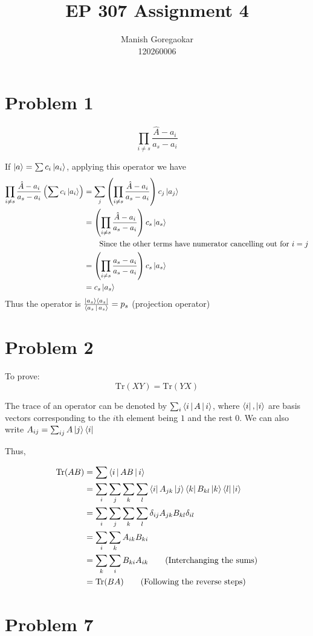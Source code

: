 \documentclass[12pt]{article}
\title{EP 307 Assignment 4}
\author{Manish Goregaokar\\120260006}
\begin{document}
\maketitle

\section*{Problem 1}
$$\prod_{i\neq s}\frac{\hat A-a_i}{a_s-a_i}$$

If $\Ket{a}=\sum c_i\Ket{a_i}$, applying this operator we have \begin{align*}
\prod_{i\neq s}\frac{\hat A-a_i}{a_s-a_i}\left(\sum c_i\Ket{a_i}\right)&=\sum_j\left(\prod_{i\neq s}\frac{\hat A-a_i}{a_s-a_i}\right)c_j\Ket{a_j}\\
&=\left(\prod_{i\neq s}\frac{\hat A-a_i}{a_s-a_i}\right)c_s\Ket{a_s}\\&\qquad\text{Since the other terms have numerator cancelling out for $i=j$}\\
&=\left(\prod_{i\neq s}\frac{a_s-a_i}{a_s-a_i}\right)c_s\Ket{a_s}\\
&=c_s\Ket{a_s}
\end{align*}
Thus the operator is $\frac{\Ket{a_s}\Bra{a_s}}{\Braket{a_s|a_s}}=p_s$ (projection operator)
\section*{Problem 2}
\newcommand{\Tr}{\mathrm{Tr}}
To prove:
$$\Tr(XY)=\Tr(YX)$$

The trace of an operator can be denoted by $\sum_i \Braket{i|A|i}$, where $\Bra{i},\Ket{i}$ are basis vectors corresponding to the $i$th element being $1$ and the rest $0$. We can also write $A_{ij}=\sum_{ij}A\Ket{j}\Bra{i}$

Thus,

\begin{align*}
\Tr(AB) 
&= \sum \Braket{i|AB|i}\\
&= \sum_i \sum_j\sum_k \sum_l  \Bra{i}A_{jk}\Ket{j}\Bra{k}B_{kl}\Ket{k}\Bra{l}\Ket{i}\\
&= \sum_i \sum_j\sum_k \sum_l \delta_{ij}A_{jk}B_{kl}\delta_{il}\\
&=  \sum_i\sum_k  A_{ik}B_{ki}\\
&=  \sum_k\sum_i  B_{ki}A_{ik}\qquad\text{(Interchanging the sums)}\\
&= \Tr(BA) \qquad\text{(Following the reverse steps)}
\end{align*}

\section*{Problem 7}
\end{document}

